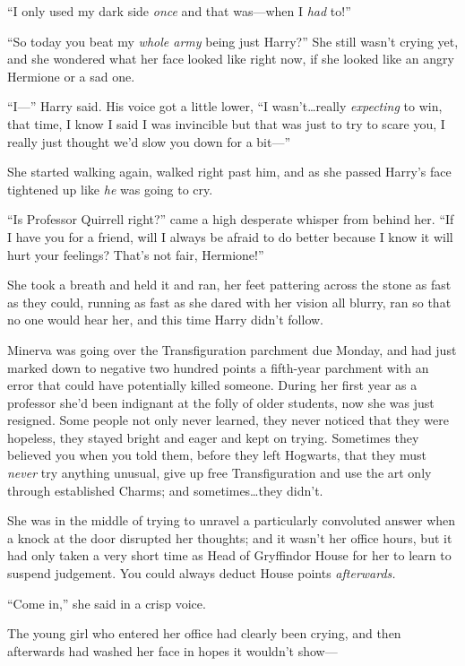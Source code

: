 “I only used my dark side \emph{once} and that was—when I \emph{had} to!”

“So today you beat my \emph{whole army} being just Harry?” She still wasn’t crying yet, and she wondered what her face looked like right now, if she looked like an angry Hermione or a sad one.

“I—” Harry said. His voice got a little lower, “I wasn’t…really \emph{expecting} to win, that time, I know I said I was invincible but that was just to try to scare you, I really just thought we’d slow you down for a bit—”

She started walking again, walked right past him, and as she passed Harry’s face tightened up like \emph{he} was going to cry.

“Is Professor Quirrell right?” came a high desperate whisper from behind her. “If I have you for a friend, will I always be afraid to do better because I know it will hurt your feelings? That’s not fair, Hermione!”

She took a breath and held it and ran, her feet pattering across the stone as fast as they could, running as fast as she dared with her vision all blurry, ran so that no one would hear her, and this time Harry didn’t follow.

\later

Minerva was going over the Transfiguration parchment due Monday, and had just marked down to negative two hundred points a fifth-year parchment with an error that could have potentially killed someone. During her first year as a professor she’d been indignant at the folly of older students, now she was just resigned. Some people not only never learned, they never noticed that they were hopeless, they stayed bright and eager and kept on trying. Sometimes they believed you when you told them, before they left Hogwarts, that they must \emph{never} try anything unusual, give up free Transfiguration and use the art only through established Charms; and sometimes…they didn’t.

She was in the middle of trying to unravel a particularly convoluted answer when a knock at the door disrupted her thoughts; and it wasn’t her office hours, but it had only taken a very short time as Head of Gryffindor House for her to learn to suspend judgement. You could always deduct House points \emph{afterwards.}

“Come in,” she said in a crisp voice.

The young girl who entered her office had clearly been crying, and then afterwards had washed her face in hopes it wouldn’t show—

